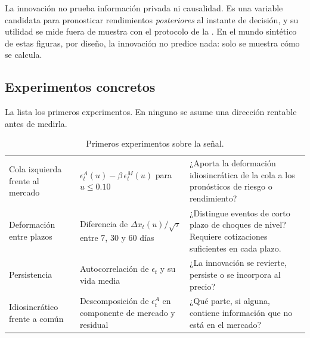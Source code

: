 

\begin{noconcluir}
La innovación no prueba información privada ni causalidad. Es una variable candidata para pronosticar
rendimientos \emph{posteriores} al instante de decisión, y su utilidad se mide fuera de muestra con el
protocolo de la . En el mundo sintético de estas figuras, por diseño, la innovación
no predice nada: solo se muestra cómo se calcula.
\end{noconcluir}

\subsection{Experimentos concretos}\label{sec:experimentos}

La  lista los primeros experimentos. En ninguno se asume una dirección rentable
antes de medirla.

\begin{table}[H]
\centering\small
\caption{Primeros experimentos sobre la señal.}
\label{tab:experimentos}
\begin{tabularx}{\linewidth}{@{}>{\RaggedRight}p{3.4cm} Y Y@{}}
\toprule
{} &  & \\
\midrule
Cola izquierda frente al mercado & $\epsilon^A_t(u)-\beta\,\epsilon^M_t(u)$ para $u\le 0.10$ & ¿Aporta la
deformación idiosincrática de la cola a los pronósticos de riesgo o rendimiento?\\
Deformación entre plazos & Diferencia de $\Delta x_t(u)/\sqrt{\tau}$ entre 7, 30 y 60 días & ¿Distingue
eventos de corto plazo de choques de nivel? Requiere cotizaciones suficientes en cada plazo.\\
Persistencia & Autocorrelación de $\epsilon_t$ y su vida media & ¿La innovación se revierte, persiste o se
incorpora al precio?\\
Idiosincrático frente a común & Descomposición de $\epsilon^A_t$ en componente de mercado y residual & ¿Qué
parte, si alguna, contiene información que no está en el mercado?\\
\bottomrule
\end{tabularx}
\end{table}

